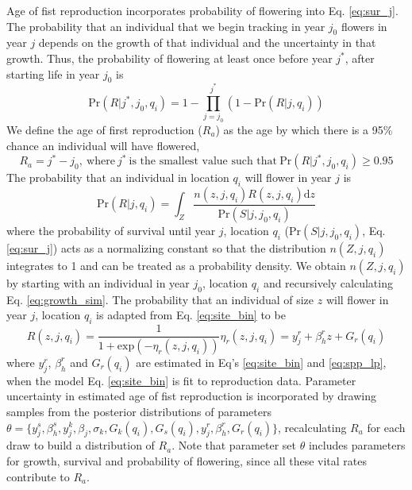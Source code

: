 \documentclass[12pt,a4paper]{article}
\begin{document}
Age of fist reproduction incorporates probability of flowering into Eq. \ref{eq:sur_j}. The probability that an individual that we begin tracking in year $j_0$ flowers in year $j$ depends on the growth of that individual and the uncertainty in that growth. Thus, the probability of flowering at least once before year $j^*$, after starting life in year $j_0$ is
\begin{equation}
	\text{Pr}(R| j^*, j_0, q_i) = 1 - \prod_{j = j_0}^{j^*} (1 - \text{Pr}(R|j, q_i)) 	
\end{equation}              
We define the age of first reproduction ($R_a$) as the age by which there is a 95\% chance an individual will have flowered,    
\begin{equation}
	R_a = j^* - j_0,~\text{where}~j^*~\text{is the smallest value such that}~\text{Pr}(R| j^*, j_0, q_i) \geq 0.95
\end{equation}
The probability that an individual in location $q_i$ will flower in year $j$ is 
\begin{equation}\label{eq:prob_rep}
	\text{Pr}(R|j, q_i) = \int_Z \frac{n(z, j, q_i)R(z, j, q_i)\text{d}z}{\text{Pr}(S|j, j_0, q_i)}
\end{equation}
where the probability of survival until year $j$, location $q_i$ ($\text{Pr}(S|j, j_0, q_i)$, Eq. \ref{eq:sur_j}) acts as a normalizing constant so that the distribution $n(Z, j, q_i)$ integrates to 1 and can be treated as a probability density. We obtain $n(Z, j, q_i)$ by starting with an individual in year $j_0$, location $q_i$ and recursively calculating Eq. \ref{eq:growth_sim}. The probability that an individual of size $z$ will flower in year $j$, location $q_i$ is adapted from Eq. \ref{eq:site_bin} to be       
\begin{subequations}
\label{eq:prob_flower}
\begin{equation}
	R(z, j, q_i) = \frac{1}{1 + \text{exp}(-\eta_r(z, j, q_i))}
\end{equation}
\begin{equation}
	\eta_r(z, j, q_i) = y_j^r + \beta_h^r z + G_r(q_i)
\end{equation}
\end{subequations}
where $y_j^r$, $\beta_h^r$ and $G_r(q_i)$ are estimated in Eq's \ref{eq:site_bin} and \ref{eq:spp_lp}, when the model Eq. \ref{eq:site_bin} is fit to reproduction data. Parameter uncertainty in estimated age of fist reproduction is incorporated by drawing samples from the posterior distributions of parameters $\theta = \{y_j^s, \beta_h^s, y_j^k, \beta_j, \sigma_k, G_k(q_i), G_s(q_i), y_j^r, \beta_h^r, G_r(q_i) \}$, recalculating $R_a$ for each draw to build a distribution of $R_a$. Note that parameter set $\theta$ includes parameters for growth, survival and probability of flowering, since all these vital rates contribute to $R_a$.
\end{document}
